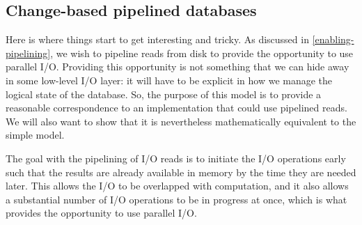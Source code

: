 \documentclass[11pt,a4paper]{article}
\begin{document}
\subsection{Change-based pipelined databases}

Here is where things start to get interesting and tricky. As discussed in
\cref{enabling-pipelining}, we wish to pipeline reads from disk to provide the
opportunity to use parallel I/O. Providing this opportunity is not something
that we can hide away in some low-level I/O layer: it will have to be explicit
in how we manage the logical state of the database. So, the purpose of this
model is to provide a reasonable correspondence to an implementation that could use
pipelined reads. We will also want to show that it is nevertheless
mathematically equivalent to the simple model.

The goal with the pipelining of I/O reads is to initiate the I/O operations
early such that the results are already available in memory by the time they are
needed later. This allows the I/O to be overlapped with computation, and it
also allows a substantial number of I/O operations to be in progress at once,
which is what provides the opportunity to use parallel I/O.
\end{document}
